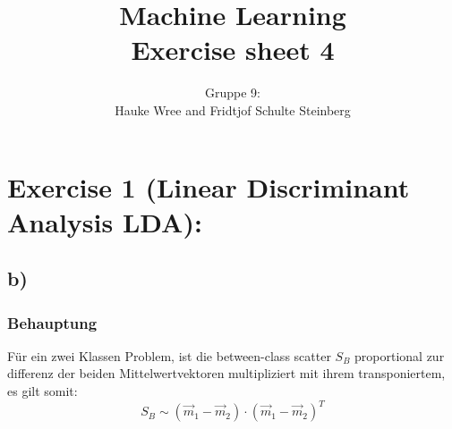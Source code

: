 \documentclass[a4paper,parskip=full-]{article}
\title{Machine Learning \\
Exercise sheet 4}
\author{Gruppe 9: \\Hauke Wree and Fridtjof Schulte Steinberg}
\begin{document}
\maketitle

\section{Exercise 1 (Linear Discriminant Analysis LDA):}
%
%
%
%

\subsection{b)}
\subsubsection{Behauptung}
Für ein zwei Klassen Problem, ist die between-class scatter $S_B$ proportional zur differenz der beiden Mittelwertvektoren multipliziert mit ihrem transponiertem, es gilt somit:
$$
S_B \sim (\vec{m}_1 - \vec{m}_2) \cdot \left( \vec{m}_1 - \vec{m}_2 \right)^T
$$
\end{document}
